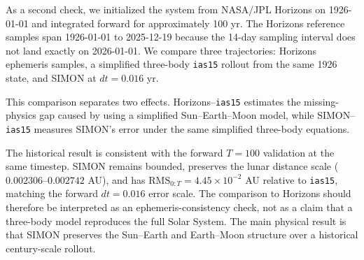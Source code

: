 \documentclass[12pt]{article}
\begin{document}
As a second check, we initialized the system from NASA/JPL Horizons on 1926-01-01 and
integrated forward for approximately 100 yr. The Horizons reference samples span
1926-01-01 to 2025-12-19 because the 14-day sampling interval does not land exactly on
2026-01-01. We compare three trajectories: Horizons ephemeris samples, a simplified
three-body \texttt{ias15} rollout from the same 1926 state, and SIMON at \(dt=0.016\) yr.

This comparison separates two effects. Horizons--\texttt{ias15} estimates the
missing-physics gap caused by using a simplified Sun--Earth--Moon model, while
SIMON--\texttt{ias15} measures SIMON's error under the same simplified three-body
equations.

\begin{table}[H]
\centering
\caption{Historical Sun--Earth--Moon validation over approximately 100 yr.}
\label{tab:real_sem_historical}
\scriptsize
\setlength{\tabcolsep}{4pt}
\renewcommand{\arraystretch}{1.12}
\end{table}

The historical result is consistent with the forward \(T=100\) validation at the same
timestep. SIMON remains bounded, preserves the lunar distance scale
(\(0.002306\)--\(0.002742\) AU), and has \(\mathrm{RMS}_{0:T}=4.45\times10^{-2}\) AU
relative to \texttt{ias15}, matching the forward \(dt=0.016\) error scale. The comparison
to Horizons should therefore be interpreted as an ephemeris-consistency check, not as a
claim that a three-body model reproduces the full Solar System. The main physical result
is that SIMON preserves the Sun--Earth and Earth--Moon structure over a historical
century-scale rollout.
\end{document}
